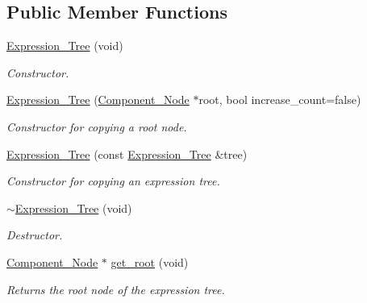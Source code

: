 \subsection*{Public Member Functions}
\begin{DoxyCompactItemize}
\item 
\hyperlink{classMadara_1_1Expression__Tree_1_1Expression__Tree_a6aae339a61966a4797923f7cf50104c4}{Expression\_\-Tree} (void)
\begin{DoxyCompactList}\small\item\em Constructor. \item\end{DoxyCompactList}\item 
\hyperlink{classMadara_1_1Expression__Tree_1_1Expression__Tree_a11c9a5dfbf7f44dd2c372443836a19f4}{Expression\_\-Tree} (\hyperlink{classMadara_1_1Expression__Tree_1_1Component__Node}{Component\_\-Node} $\ast$root, bool increase\_\-count=false)
\begin{DoxyCompactList}\small\item\em Constructor for copying a root node. \item\end{DoxyCompactList}\item 
\hyperlink{classMadara_1_1Expression__Tree_1_1Expression__Tree_a92570ddc5914b7faf55ce0b983dfb55e}{Expression\_\-Tree} (const \hyperlink{classMadara_1_1Expression__Tree_1_1Expression__Tree}{Expression\_\-Tree} \&tree)
\begin{DoxyCompactList}\small\item\em Constructor for copying an expression tree. \item\end{DoxyCompactList}\item 
\hyperlink{classMadara_1_1Expression__Tree_1_1Expression__Tree_ae6801155228779f834c1af639ea56c66}{$\sim$Expression\_\-Tree} (void)
\begin{DoxyCompactList}\small\item\em Destructor. \item\end{DoxyCompactList}\item 
\hyperlink{classMadara_1_1Expression__Tree_1_1Component__Node}{Component\_\-Node} $\ast$ \hyperlink{classMadara_1_1Expression__Tree_1_1Expression__Tree_af1e3b1868881a8c02ccc38700b957742}{get\_\-root} (void)
\begin{DoxyCompactList}\small\item\em Returns the root node of the expression tree. \item\end{DoxyCompactList}\item 

\end{DoxyCompactItemize}
